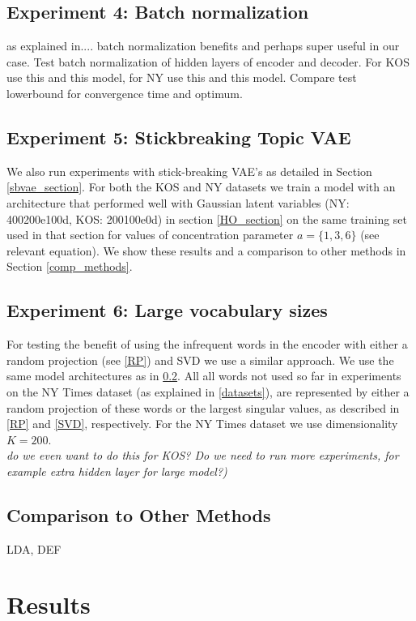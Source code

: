 \documentclass{report}
\begin{document}
	\subsection{Experiment 4: Batch normalization}\label{batch_norm}
	as explained in.... batch normalization benefits and perhaps super useful in our case. Test batch normalization of hidden layers of encoder and decoder. For KOS use this and this model, for NY use this and this model. Compare test lowerbound for convergence time and optimum. 
	\subsection{Experiment 5: Stickbreaking Topic VAE}\label{sbvae_exp}
	
	We also run experiments with stick-breaking VAE's as detailed in Section \ref{sbvae_section}. For both the KOS and NY datasets we train a model with an architecture that performed well with Gaussian latent variables (NY: 400200e100d, KOS: 200100e0d) in section \ref{HO_section} on the same training set used in that section for values of concentration parameter $a= \{1,3,6\}$ (see relevant equation). We show these results and a comparison to other methods in Section \ref{comp_methods}.
	
	\subsection{Experiment 6: Large vocabulary sizes}\label{large_voc_size}
	For testing the benefit of using the infrequent words in the encoder with either a random projection (see \ref{RP}) and SVD  we use a similar approach. We use the same model architectures as in \ref{sbvae_exp}. All all words not used so far in experiments on the NY Times dataset (as explained in \ref{datasets}), are represented by either a random projection of these words or the largest singular values, as described in \ref{RP} and \ref{SVD}, respectively. For the NY Times dataset we use dimensionality $K = 200$. \\
	\textit{do we even want to do this for KOS? Do we need to run more experiments, for example extra hidden layer for large model?)}
		
	\subsection{Comparison to Other Methods}
	LDA, DEF
	
	
	
	\section{Results}
	
\end{document}
